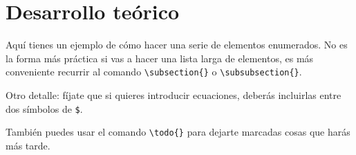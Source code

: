 \section{Desarrollo teórico}

Aquí tienes un ejemplo de cómo hacer una serie de elementos enumerados. No es la forma más práctica si vas a hacer una lista larga de elementos, es más conveniente recurrir al comando \verb|\subsection{}| o \verb|\subsubsection{}|.

Otro detalle: fíjate que si quieres introducir ecuaciones, deberás incluirlas entre dos símbolos de \verb|$|.

También puedes usar el comando \verb|\todo{}| para dejarte marcadas cosas que harás más tarde.

